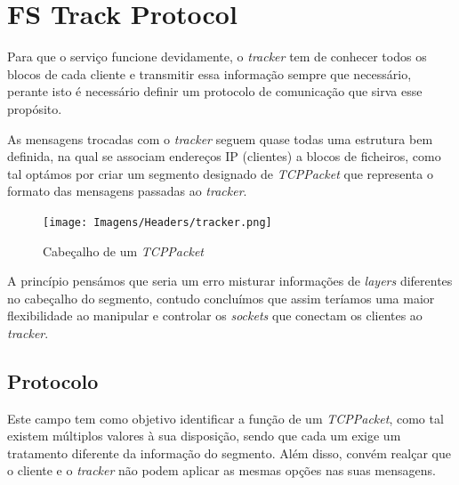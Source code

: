 \section{FS Track Protocol}

    Para que o serviço funcione devidamente, o \textit{tracker} tem de conhecer todos os blocos de cada cliente e transmitir essa informação sempre que necessário, perante isto é necessário definir um protocolo de comunicação que sirva esse propósito.

    As mensagens trocadas com o \textit{tracker} seguem quase todas uma estrutura bem definida, na qual se associam endereços IP (clientes) a blocos de ficheiros, como tal optámos por criar um segmento designado de \textit{TCPPacket} que representa o formato das mensagens passadas ao \textit{tracker}.

    \begin{figure}[hb!]
        \centering
        \texttt{[image: Imagens/Headers/tracker.png]}
        \caption{Cabeçalho de um \textit{TCPPacket}}
    \end{figure}
    \vspace{-10pt}

    A princípio pensámos que seria um erro misturar informações de \textit{layers} diferentes no cabeçalho do segmento, contudo concluímos que assim teríamos uma maior flexibilidade ao manipular e controlar os \textit{sockets} que conectam os clientes ao \textit{tracker}.

    \subsection{Protocolo}

        Este campo tem como objetivo identificar a função de um \textit{TCPPacket}, como tal existem múltiplos valores à sua disposição, sendo que cada um exige um tratamento diferente da informação do segmento. Além disso, convém realçar que o cliente e o \textit{tracker} não podem aplicar as mesmas opções nas suas mensagens. 

